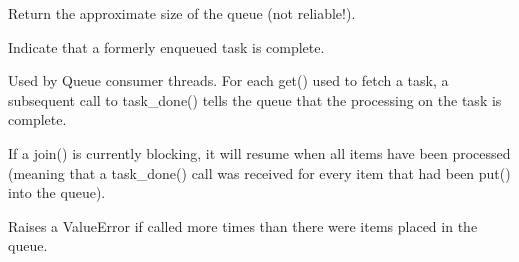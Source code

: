 \documentclass[letterpaper,10pt,english]{sphinxmanual}
\begin{document}
\begin{fulllineitems}
\begin{fulllineitems}
\end{fulllineitems}


\begin{fulllineitems}
\label{\detokenize{modules/src.model_training.trainer:src.model_training.trainer.Queue.qsize}}
\pysigstartsignatures
\pysiglinewithargsret
{}
{}
{}
\pysigstopsignatures
\sphinxAtStartPar
Return the approximate size of the queue (not reliable!).

\end{fulllineitems}


\begin{fulllineitems}
\label{\detokenize{modules/src.model_training.trainer:src.model_training.trainer.Queue.task_done}}
\pysigstartsignatures
\pysiglinewithargsret
{}
{}
{}
\pysigstopsignatures
\sphinxAtStartPar
Indicate that a formerly enqueued task is complete.

\sphinxAtStartPar
Used by Queue consumer threads.  For each get() used to fetch a task,
a subsequent call to task\_done() tells the queue that the processing
on the task is complete.

\sphinxAtStartPar
If a join() is currently blocking, it will resume when all items
have been processed (meaning that a task\_done() call was received
for every item that had been put() into the queue).

\sphinxAtStartPar
Raises a ValueError if called more times than there were items
placed in the queue.

\end{fulllineitems}


\end{fulllineitems}

\end{document}

